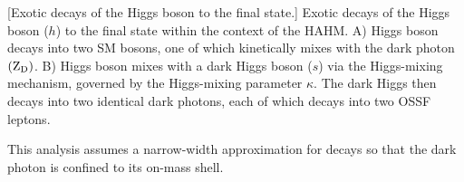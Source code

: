 \begin{multiFigure}
        \centering
            [Exotic decays of the Higgs boson to the \fourl final state.]
            {Exotic decays of the Higgs boson ($h$) to the \fourl final state within the context of the HAHM.
            A) Higgs boson decays into two SM \PZ bosons, one of which kinetically mixes with the dark photon $\left(\mathrm{Z}_\text{D}\right)$.
            B) Higgs boson mixes with a dark Higgs boson ($s$) via the Higgs-mixing mechanism, governed by the Higgs-mixing parameter $\kappa$.
            The dark Higgs then decays into two identical dark photons, each of which decays into two OSSF leptons.}
        \label{fig:feyn_diag_hzzd4l_hzdzd4l}
\end{multiFigure}
This analysis assumes a narrow-width approximation for \PZD decays so that the dark photon is confined to its on-mass shell.
